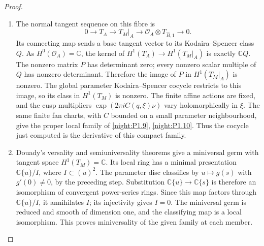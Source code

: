 \begin{proof}
\begin{enumerate}[label={$\langle1\rangle$\arabic*.}]
\item The normal tangent sequence on this fibre is
\[
0\longrightarrow T_A\longrightarrow T_M|_A
\longrightarrow\mathcal O_A\otimes T_{\widehat B,1}
\longrightarrow0.
\]
Its connecting map sends a base tangent vector to its
Kodaira--Spencer class $Q$.  As $H^0(\mathcal O_A)=\mathbb C$,
the kernel of $H^1(T_A)\to H^1(T_M|_A)$ is exactly
$\mathbb C Q$.  The nonzero matrix $P$ has determinant zero;
every nonzero scalar multiple of $Q$ has nonzero determinant.
Therefore the image of $P$ in $H^1(T_M|_A)$ is nonzero.
The global parameter Kodaira--Spencer cocycle restricts to this
image, so its class in $H^1(T_M)$ is nonzero.
The finite affine actions are fixed, and the cusp multipliers
$\exp(2\pi iC(q,\xi)\nu)$ vary holomorphically in $\xi$.
The same finite fan charts, with $C$ bounded on a small parameter
neighbourhood, give the proper local family of
\cref{night:P1.9}, \cref{night:P1.10}.  Thus the cocycle just computed is
the derivative of this compact family.

\item Douady's versality and semiuniversality theorems
\cite[\S VII.8, pp.~598--599; \S VIII.1, pp.~599--600]{Douady1974}
give a miniversal germ with tangent space $H^1(T_M)=\mathbb C$.
Its local ring has a minimal presentation $\mathbb C\{u\}/I$,
where $I\subset(u)^2$.  The parameter disc classifies by
$u\mapsto g(s)$ with $g'(0)\ne0$, by the preceding step.
Substitution $\mathbb C\{u\}\to\mathbb C\{s\}$ is therefore an
isomorphism of convergent power-series rings.  Since this map factors
through $\mathbb C\{u\}/I$, it annihilates $I$; its injectivity
gives $I=0$.  The miniversal germ is reduced and smooth of dimension
one, and the classifying map is a local isomorphism.  This proves
miniversality of the given family at each member.
\end{enumerate}
\end{proof}




